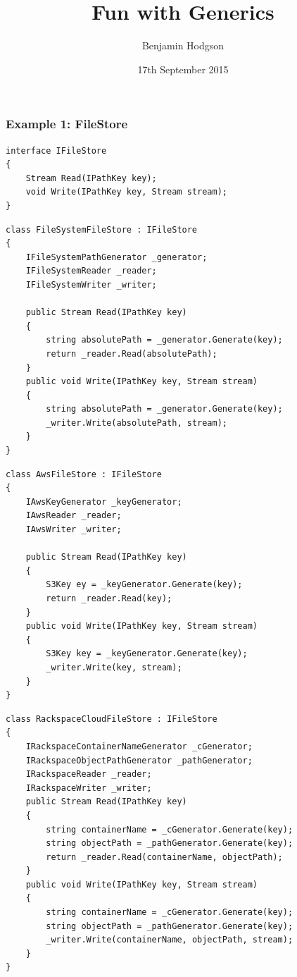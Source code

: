 \documentclass{beamer}
\title{Fun with Generics}
\author{Benjamin Hodgson}
\date{17th September 2015}
\begin{document}
  \frame{\titlepage}

  \begin{frame}[fragile]
    \frametitle{Example 1: FileStore}
    \begin{verbatim}
interface IFileStore
{
    Stream Read(IPathKey key);
    void Write(IPathKey key, Stream stream);
}
    \end{verbatim}
\end{frame}

  \begin{frame}[fragile]
    \begin{verbatim}
class FileSystemFileStore : IFileStore
{
    IFileSystemPathGenerator _generator;
    IFileSystemReader _reader;
    IFileSystemWriter _writer;
    
    public Stream Read(IPathKey key)
    {
        string absolutePath = _generator.Generate(key);
        return _reader.Read(absolutePath);
    }
    public void Write(IPathKey key, Stream stream)
    {
        string absolutePath = _generator.Generate(key);
        _writer.Write(absolutePath, stream);
    }
}
    \end{verbatim}
\end{frame}

  \begin{frame}[fragile]
    \begin{verbatim}
class AwsFileStore : IFileStore
{
    IAwsKeyGenerator _keyGenerator;
    IAwsReader _reader;
    IAwsWriter _writer;

    public Stream Read(IPathKey key)
    {
        S3Key ey = _keyGenerator.Generate(key);
        return _reader.Read(key);
    }
    public void Write(IPathKey key, Stream stream)
    {
        S3Key key = _keyGenerator.Generate(key);
        _writer.Write(key, stream);
    }
}
    \end{verbatim}
\end{frame}

  \begin{frame}[fragile]
    \begin{verbatim}
class RackspaceCloudFileStore : IFileStore
{
    IRackspaceContainerNameGenerator _cGenerator;
    IRackspaceObjectPathGenerator _pathGenerator;
    IRackspaceReader _reader;
    IRackspaceWriter _writer;
    public Stream Read(IPathKey key)
    {
        string containerName = _cGenerator.Generate(key);
        string objectPath = _pathGenerator.Generate(key);
        return _reader.Read(containerName, objectPath);
    }
    public void Write(IPathKey key, Stream stream)
    {
        string containerName = _cGenerator.Generate(key);
        string objectPath = _pathGenerator.Generate(key);
        _writer.Write(containerName, objectPath, stream);
    }
}
    \end{verbatim}
\end{frame}
\end{document}
